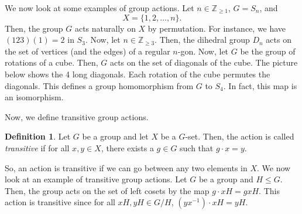 \documentclass[a4paper, openany]{memoir}
\theoremstyle{definition}
\newtheorem{definition}{Definition}[section]
\theoremstyle{plain}
\begin{document}
We now look at some examples of group actions. Let $n \in \mathbb{Z}_{\geq 1}$, $G = S_n$, and
\[X = \{1, 2, \dots, n\}.\]
Then, the group $G$ acts naturally on $X$ by permutation. For instance, we have $(123)(1) = 2$ in $S_3$. Now, let $n \in \mathbb{Z}_{\geq 3}$. Then, the dihedral group $D_n$ acts on the set of vertices (and the edges) of a regular $n$-gon. Now, let $G$ be the group of rotations of a cube. Then, $G$ acts on the set of diagonals of the cube. The picture below shows the 4 long diagonals.
Each rotation of the cube permutes the diagonals. This defines a group homomorphism from $G$ to $S_4$. In fact, this map is an isomorphism.

Now, we define transitive group actions.
\begin{definition}
Let $G$ be a group and let $X$ be a $G$-set. Then, the action is called \emph{transitive} if for all $x, y \in X$, there exists a $g \in G$ such that $g \cdot x = y$.
\end{definition}
\noindent So, an action is transitive if we can go between any two elements in $X$. We now look at an example of transitive group actions. Let $G$ be a group and $H \leq G$. Then, the group acts on the set of left cosets by the map $g \cdot xH = gxH$. This action is transitive since for all $xH, yH \in G/H$, $(yx^{-1}) \cdot xH = yH$.
\end{document}
